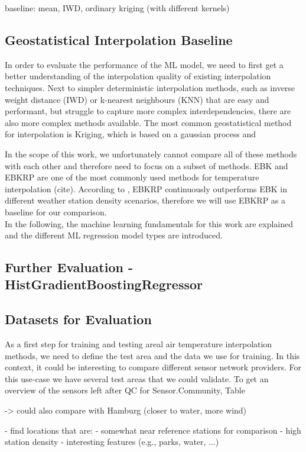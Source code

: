 baseline: mean, IWD, ordinary kriging (with different kernels)

\subsection{Geostatistical Interpolation Baseline}
In order to evaluate the performance of the ML model, we need to first get a better understanding of the interpolation quality of existing interpolation techniques. Next to simpler deterministic interpolation methods, such as inverse weight distance (IWD) or k-nearest neighbours (KNN) that are easy and performant, but struggle to capture more complex interdependencies, there are also more complex methods available. The most common geostatistical method for interpolation is Kriging, which is based on a gaussian process and 

In the scope of this work, we unfortunately cannot compare all of these methods with each other and therefore need to focus on a subset of methods. EBK and EBKRP are one of the most commonly used methods for temperature interpolation (cite). According to \cite{njoku2023effects}, EBKRP continuously outperforms EBK in different weather station density scenarios, therefore we will use EBKRP as a baseline for our comparison.\\
In the following, the machine learning fundamentals for this work are explained and the different ML regression model types are introduced.


\subsection{Further Evaluation - HistGradientBoostingRegressor}

\subsection{Datasets for Evaluation}

As a first step for training and testing areal air temperature interpolation methods, we need to define the test area and the data we use for training. In this context, it could be interesting to compare different sensor network providers.
For this use-case we have several test areas that we could validate. To get an overview of the sensors left after QC for Sensor.Community, Table 

-> could also compare with Hamburg (closer to water, more wind)

- find locations that are:
  - somewhat near reference stations for comparison
  - high station density
  - interesting features (e.g., parks, water, ...)

